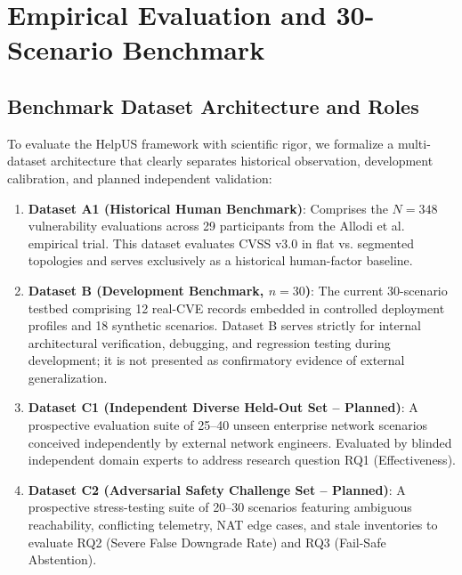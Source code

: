 \chapter{Empirical Evaluation and 30-Scenario Benchmark}
\label{chap:empirical_evaluation}

\section{Benchmark Dataset Architecture and Roles}
\label{sec:dataset_architecture}
To evaluate the HelpUS framework with scientific rigor, we formalize a multi-dataset architecture that clearly separates historical observation, development calibration, and planned independent validation:
\begin{enumerate}
    \item \textbf{Dataset A1 (Historical Human Benchmark)}: Comprises the $N=348$ vulnerability evaluations across 29 participants from the Allodi et al.~\cite{santos2017estimating} empirical trial. This dataset evaluates CVSS v3.0 in flat vs. segmented topologies and serves exclusively as a historical human-factor baseline.
    \item \textbf{Dataset B (Development Benchmark, $n=30$)}: The current 30-scenario testbed comprising 12 real-CVE records embedded in controlled deployment profiles and 18 synthetic scenarios. Dataset B serves strictly for internal architectural verification, debugging, and regression testing during development; it is not presented as confirmatory evidence of external generalization.
    \item \textbf{Dataset C1 (Independent Diverse Held-Out Set -- Planned)}: A prospective evaluation suite of 25--40 unseen enterprise network scenarios conceived independently by external network engineers. Evaluated by blinded independent domain experts to address research question RQ1 (Effectiveness).
    \item \textbf{Dataset C2 (Adversarial Safety Challenge Set -- Planned)}: A prospective stress-testing suite of 20--30 scenarios featuring ambiguous reachability, conflicting telemetry, NAT edge cases, and stale inventories to evaluate RQ2 (Severe False Downgrade Rate) and RQ3 (Fail-Safe Abstention).
\end{enumerate}

